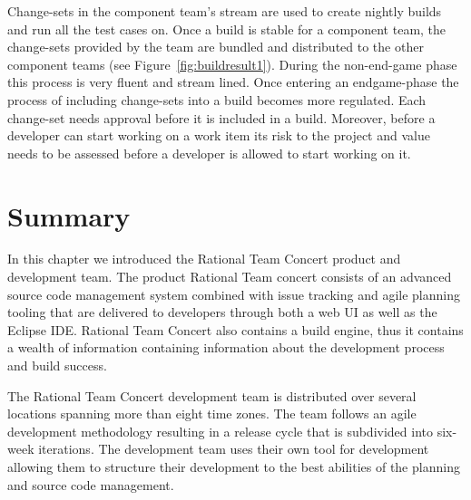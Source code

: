 Change-sets in the component team's stream are used to create nightly builds and run all the test cases on.
Once a build is stable for a component team, the change-sets provided by the team are bundled and distributed to the other component teams (see Figure~\ref{fig:buildresult1}).
During the non-end-game phase this process is very fluent and stream lined.
Once entering an endgame-phase the process of including change-sets into a build becomes more regulated.
Each change-set needs approval before it is included in a build.
Moreover, before a developer can start working on a work item its risk to the project and value needs to be assessed before a developer is allowed to start working on it.

\section{Summary}
In this chapter we introduced the Rational Team Concert product and development team.
The product Rational Team concert consists of an advanced source code management system combined with issue tracking and agile planning tooling that are delivered to developers through both a web UI as well as the Eclipse IDE.
Rational Team Concert also contains a build engine, thus it contains a wealth of information containing information about the development process and build success.

The Rational Team Concert development team is distributed over several locations spanning more than eight time zones.
The team follows an agile development methodology resulting in a release cycle that is subdivided into six-week iterations.
The development team uses their own tool for development allowing them to structure their development to the best abilities of the planning and source code management.
